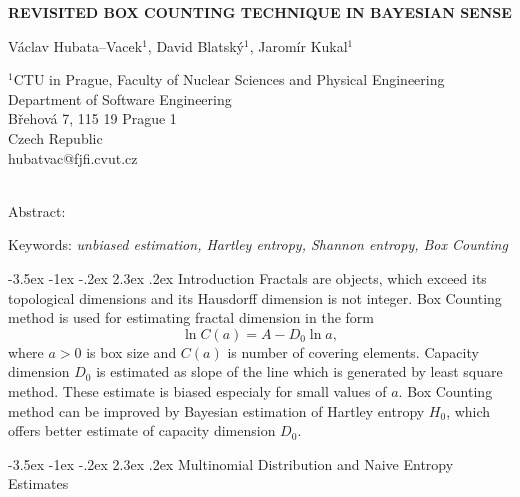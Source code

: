 \documentclass[a4paper,10pt]{article}
\makeatletter
\renewcommand\section{\@startsection {section}{1}{\z@}%
                                   {-3.5ex \@plus -1ex \@minus -.2ex}%
                                   {2.3ex \@plus.2ex}%
                                   {\large\bfseries}}
\makeatother
\begin{document}
\pagestyle{empty}

\begin{center}
{\bf \Large REVISITED BOX COUNTING TECHNIQUE IN BAYESIAN SENSE}
\end{center}

\smallskip
\begin{center}
{\large V\'{a}clav Hubata--Vacek$^1$, David Blatsk\'{y}$^1$, Jarom\'{i}r Kukal$^1$}
\end{center}

\smallskip
\begin{center}
$^1$CTU in Prague, Faculty of Nuclear Sciences and Physical Engineering\\
Department of Software Engineering \\
B\v{r}ehov\'{a} 7, 115 19 Prague 1 \\
Czech Republic\\
hubatvac@fjfi.cvut.cz\\
 ~\\

\end{center}

\bigskip
\noindent Abstract: \textit{}

\vspace*{10pt} \noindent Keywords: \textit{unbiased estimation, Hartley entropy, Shannon entropy, Box Counting}


\bigskip
\section {Introduction }
Fractals are objects, which exceed its topological dimensions and its Hausdorff dimension is not integer. Box Counting method is used for estimating fractal dimension in the form
\begin{equation} 
\label{eq:boxcount}
\ln{C(a)} = A - D_{0}\ln{a},
\end{equation}
where $a>0$ is box size and $C(a)$ is number of covering elements. Capacity dimension $D_{0}$ is estimated as slope of the line which is generated by least square method. These estimate is biased especialy for small values of $a$. Box Counting method can be improved by Bayesian estimation of Hartley entropy $H_{0}$, which offers better estimate of capacity dimension $D_{0}$.

\section {Multinomial Distribution and Naive Entropy Estimates}
\end{document}
